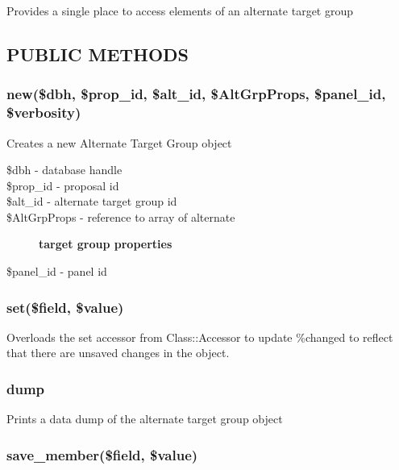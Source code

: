 \documentclass{article}
\begin{document}
Provides a single place to access elements of an alternate target group

\subsection*{PUBLIC METHODS\label{AltGrp_PUBLIC_METHODS}}
\subsubsection*{new(\$dbh, \$prop\_id, \$alt\_id, \$AltGrpProps, \$panel\_id, \$verbosity)\label{AltGrp_new_dbh_prop_id_alt_id_AltGrpProps_panel_id_verbosity_}}


Creates a new Alternate Target Group object

\begin{description}

\item[{\$dbh - database handle}] \mbox{}
\item[{\$prop\_id - proposal id}] \mbox{}
\item[{\$alt\_id - alternate target group id}] \mbox{}
\item[{\$AltGrpProps - reference to array of alternate}] \textbf{target group properties}
\item[{\$panel\_id - panel id}] \mbox{}\end{description}
\subsubsection*{set(\$field, \$value)\label{AltGrp_set_field_value_}}


Overloads the set accessor from Class::Accessor to update \%changed to
reflect that there are unsaved changes in the object.

\subsubsection*{dump\label{AltGrp_dump}}


Prints a data dump of the alternate target group object

\subsubsection*{save\_member(\$field, \$value)\label{AltGrp_save_member_field_value_}}
\end{document}
